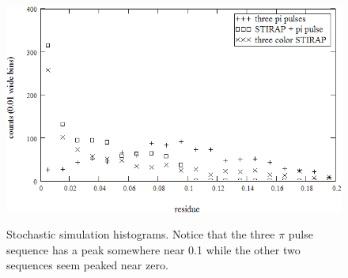 \begin{figure}
\includegraphics[width=5.00in]
{histogram/histogram.png}\\
\caption[Stochastic simulation histograms]{Stochastic simulation histograms. Notice that the three $\pi$ pulse sequence has a peak somewhere near 0.1 while the other two sequences seem peaked near zero.}
\label{histogram}
\end{figure} 
